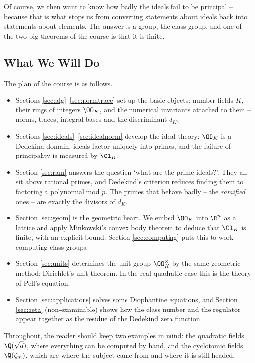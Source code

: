 Of course, we then want to know how badly the ideals fail to be principal -- because that is what stops us from converting statements about ideals back into statements about elements. The answer is a group, the class group, and one of the two big theorems of the course is that it is finite.

\subsection{What We Will Do}

The plan of the course is as follows.
\begin{itemize}
	\item Sections \ref{sec:alg}--\ref{sec:normtrace} set up the basic objects: number fields $K$, their rings of integers $\OO_K$, and the numerical invariants attached to them -- norms, traces, integral bases and the discriminant $d_K$.
	\item Sections \ref{sec:ideals}--\ref{sec:idealnorm} develop the ideal theory: $\OO_K$ is a Dedekind domain, ideals factor uniquely into primes, and the failure of principality is measured by $\Cl_K$.
	\item Section \ref{sec:ram} answers the question `what are the prime ideals?'. They all sit above rational primes, and Dedekind's criterion reduces finding them to factoring a polynomial mod $p$. The primes that behave badly -- the \emph{ramified} ones -- are exactly the divisors of $d_K$.
	\item Section \ref{sec:geom} is the geometric heart. We embed $\OO_K$ into $\R^n$ as a lattice and apply Minkowski's convex body theorem to deduce that $\Cl_K$ is finite, with an explicit bound. Section \ref{sec:computing} puts this to work computing class groups.
	\item Section \ref{sec:units} determines the unit group $\OO_K^\times$ by the same geometric method: Dirichlet's unit theorem. In the real quadratic case this is the theory of Pell's equation.
	\item Section \ref{sec:applications} solves some Diophantine equations, and Section \ref{sec:zeta} (non-examinable) shows how the class number and the regulator appear together as the residue of the Dedekind zeta function.
\end{itemize}

Throughout, the reader should keep two examples in mind: the quadratic fields $\Q(\sqrt d)$, where everything can be computed by hand, and the cyclotomic fields $\Q(\zeta_m)$, which are where the subject came from and where it is still headed.

